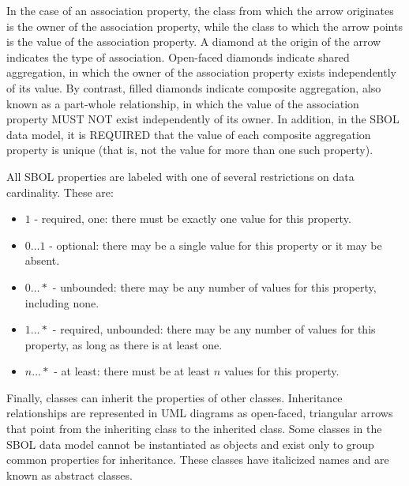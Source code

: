 In the case of an association property, the class from which the arrow originates is the owner of the association property, while the class to which the arrow points is the value of the association property. A diamond at the origin of the arrow indicates the type of association. Open-faced diamonds indicate shared aggregation, in which the owner of the association property exists independently of its value. By contrast, filled diamonds indicate composite aggregation, also known as a part-whole relationship, in which the value of the association property MUST NOT exist independently of its owner. In addition, in the SBOL data model, it is REQUIRED that the value of each composite aggregation property is unique (that is, not the value for more than one such property).

All SBOL properties are labeled with one of several restrictions on data cardinality. These are:

\begin{itemize}

\item $1$ - required, one: there must be exactly one value for this property.

\item $0 \ldots 1$ - optional: there may be a single value for this property or it may be absent.

\item $0 \ldots *$ - unbounded: there may be any number of values for this property, including none.

\item $1 \ldots *$ - required, unbounded: there may be any number of values for this property, as long as there is at least one.

\item $n \ldots *$ - at least: there must be at least $n$ values for this property.

\end{itemize}

Finally, classes can inherit the properties of other classes. Inheritance relationships are represented in UML diagrams as open-faced, triangular arrows that point from the inheriting class to the inherited class. Some classes in the SBOL data model cannot be instantiated as objects and exist only to group common properties for inheritance. These classes have italicized names and are known as abstract classes.

